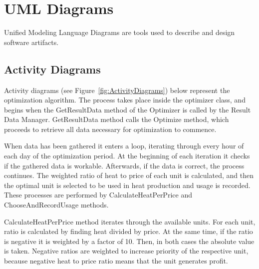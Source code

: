 \section{UML Diagrams}
\noindent Unified Modeling Language Diagrams are tools used to describe and design software artifacts.

\subsection{Activity Diagrams}
\noindent Activity diagrams (see Figure~\ref{fig:ActivityDiagrams}) below represent the optimization algorithm. The process takes place inside the optimizer class, and begins when the GetResultData method of the Optimizer is called by the Result Data Manager. GetResultData method calls the Optimize method, which proceeds to retrieve all data necessary for optimization to commence. 

\noindent When data has been gathered it enters a loop, iterating through every hour of each day of the optimization period. At the beginning of each iteration it checks if the gathered data is workable. Afterwards, if the data is correct, the process continues. The weighted ratio of heat to price of each unit is calculated, and then the optimal unit is selected to be used in heat production and usage is recorded. These processes are performed by CalculateHeatPerPrice and ChooseAndRecordUsage methods.

\noindent CalculateHeatPerPrice method iterates through the available units. For each unit, ratio is calculated by finding heat divided by price. At the same time, if the ratio is negative it is weighted by a factor of 10. Then, in both cases the absolute value is taken. Negative ratios are weighted to increase priority of the respective unit, because negative heat to price ratio means that the unit generates profit. 

